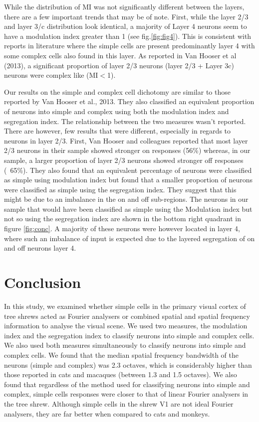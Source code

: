 	While the distribution of MI was not significantly different between the layers, there are a few important trends that may be of note. First, while the layer 2/3 and layer 3/c distribution look identical, a majority of Layer 4 neurons seem to have a modulation index greater than 1 (see fig.\ref{fig:fig4}). This is consistent with reports in literature where the simple cells are present predominantly layer 4 with some complex cells also found in this layer. As reported in Van Hooser et al (2013), a significant proportion of layer 2/3 neurons (layer 2/3 + Layer 3c) neurons were complex like (MI$<$1).
	
	Our results on the simple and complex cell dichotomy are similar to those reported by Van Hooser et al., 2013. They also classified an equivalent proportion of neurons into simple and complex using both the modulation index and segregation index. The relationship between the two measures wasn't reported. There are however, few results that were different, especially in regards to neurons in layer 2/3. First, Van Hooser and colleagues reported that most layer 2/3 neurons in their sample showed stronger on responses (56\%) whereas, in our sample, a larger proportion of layer 2/3 neurons showed stronger off responses (~65\%). They also found that an equivalent percentage of neurons were classified as simple using modulation index but found that a smaller proportion of neurons were classified as simple using the segregation index. They suggest that this might be due to an imbalance in the on and off sub-regions. The neurons in our sample that would have been classified as simple using the Modulation index but not so using the segregation index are shown in the bottom right quadrant in figure \ref{fig:conc}. A majority of these neurons were however located in layer 4, where such an imbalance of input is expected due to the layered segregation of on and off neurons layer 4.
	
	
	\section{Conclusion}
	
	In this study, we examined whether simple cells in the primary visual cortex of tree shrews acted as Fourier analysers or combined spatial and spatial frequency information to analyse the visual scene. We used two measures, the modulation index and the segregation index to classify neurons into simple and complex cells. We also used both measures simultaneously to classify neurons into simple and complex cells. We found that the median spatial frequency bandwidth of the neurons (simple and complex) was 2.3 octaves, which is considerably higher than those reported in cats and macaques (between 1.3 and 1.5 octaves). We also found that regardless of the method used for classifying neurons into simple and complex, simple cells responses were closer to that of linear Fourier analysers in the tree shrew. Although simple cells in the shrew V1 are not ideal Fourier analysers, they are far better when compared to cats and monkeys.
